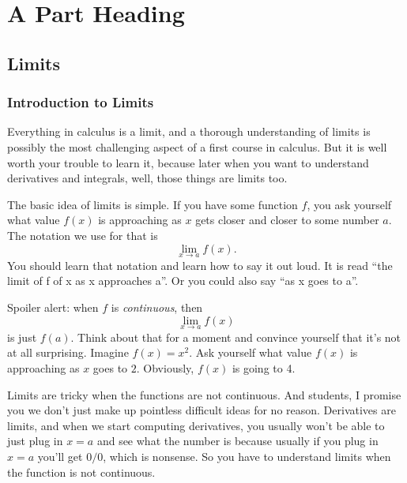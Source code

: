 \documentclass[11pt]{book}
\makeatletter
\newcommand{\hilight@DoHighlight}{
  \fill [ decoration = {random steps, amplitude=1pt, segment length=15pt}
        , outer sep = -15pt, inner sep = 0pt, decorate
        , every highlighter, this highlighter ]
        ($(begin highlight)+(0,8pt)$) rectangle ($(end highlight)+(0,-3pt)$) ;
}
\newcommand{\hilight@BeginHighlight}{
  \coordinate (begin highlight) at (0,0) ;
}
\newcommand{\hilight@EndHighlight}{
  \coordinate (end highlight) at (0,0) ;
}
\DeclareRobustCommand*\hilight[1][]{%
  \tikzset{this highlighter/.style={#1}}%
  \SOUL@setup
  \def\SOUL@preamble{%
    \begin{tikzpicture}[overlay, remember picture]
      \hilight@BeginHighlight
      \hilight@EndHighlight
    \end{tikzpicture}%
  }%
  \def\SOUL@postamble{%
    \begin{tikzpicture}[overlay, remember picture]
      \hilight@EndHighlight
      \hilight@DoHighlight
    \end{tikzpicture}%
  }%
  \def\SOUL@everyhyphen{%
    \discretionary{%
      \SOUL@setkern\SOUL@hyphkern
      \SOUL@sethyphenchar
      \tikz[overlay, remember picture] \hilight@EndHighlight ;%
    }{%
    }{%
      \SOUL@setkern\SOUL@charkern
    }%
  }%
  \def\SOUL@everyexhyphen##1{%
    \SOUL@setkern\SOUL@hyphkern
    \hbox{##1}%
    \discretionary{%
      \tikz[overlay, remember picture] \hilight@EndHighlight ;%
    }{%
    }{%
      \SOUL@setkern\SOUL@charkern
    }%
  }%
  \def\SOUL@everysyllable{%
    \begin{tikzpicture}[overlay, remember picture]
      \path let \p0 = (begin highlight), \p1 = (0,0) in \pgfextra
        \global\hilight@previous=\y0
        \global\hilight@current =\y1
      \endpgfextra (0,0) ;
      \ifdim\hilight@current < \hilight@previous
        \hilight@DoHighlight
        \hilight@BeginHighlight
      \fi
    \end{tikzpicture}%
    \the\SOUL@syllable
    \tikz[overlay, remember picture] \hilight@EndHighlight ;%
  }%
  \SOUL@
}
\numberwithin{example}{chapter}
\makeatother
\begin{document}
\part{A Part Heading}                   %






\chapter{Limits}     

\section{Introduction to Limits}

Everything in calculus is a limit, and a thorough understanding of limits is possibly the most challenging aspect of a first course in calculus.  But it is well worth your trouble to learn it, because later when you want to understand derivatives and integrals, well, those things are limits too.  

The basic idea of limits is simple.  If you have some function $f$, you ask yourself what value $f(x)$ is approaching as $x$ gets closer and closer to some number $a$.  The notation we use for that is $$\lim_{x\to a} f(x).$$  You should learn that notation and learn how to say it out loud.  It is read ``the limit of f of x as x approaches a''.  Or you could also say ``as x goes to a''.  

Spoiler alert: when $f$ is \emph{continuous}, then $$\lim_{x\to a} f(x)$$ is just $f(a)$.  Think about that for a moment and convince yourself that it's not at all surprising.  Imagine $f(x)=x^2$.  Ask yourself what value $f(x)$ is approaching as $x$ goes to $2$.  Obviously, $f(x)$ is going to 4.

Limits are tricky when the functions are not continuous.  And students, I promise you we don't just make up pointless difficult ideas for no reason.  Derivatives are limits, and when we start computing derivatives, you usually won't be able to just plug in $x=a$ and see what the number is because usually if you plug in $x=a$ you'll get $0/0$, which is nonsense.  So you have to understand limits when the function \hilight{is not continuous}.
\end{document}

